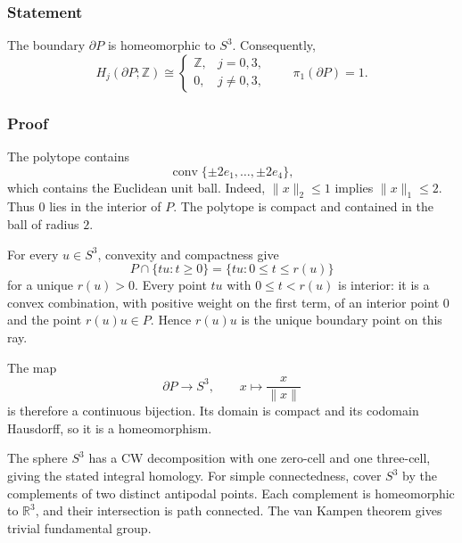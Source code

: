 \documentclass[
  10pt,
  a4paper,
]{article}
\begin{document}
\subsubsection{Statement}\label{statement-1}

The boundary \(\partial P\) is homeomorphic to \(S^3\). Consequently,
\begin{equation}
H_j(\partial P;\mathbb Z)\cong
\begin{cases}
\mathbb Z,&j=0,3,\\
0,&j\ne0,3,
\end{cases}
\qquad
\pi_1(\partial P)=1.
\end{equation}

\subsubsection{Proof}\label{proof-1}

The polytope contains \begin{equation}
\operatorname{conv}\{\pm2e_1,\ldots,\pm2e_4\},
\end{equation} which contains the Euclidean unit ball. Indeed,
\(\|x\|_2\le1\) implies \(\|x\|_1\le2\). Thus \(0\) lies in the interior
of \(P\). The polytope is compact and contained in the ball of radius
\(2\).

For every \(u\in S^3\), convexity and compactness give \begin{equation}
P\cap\{tu:t\ge0\}=\{tu:0\le t\le r(u)\}
\end{equation} for a unique \(r(u)>0\). Every point \(tu\) with
\(0\le t<r(u)\) is interior: it is a convex combination, with positive
weight on the first term, of an interior point \(0\) and the point
\(r(u)u\in P\). Hence \(r(u)u\) is the unique boundary point on this
ray.

The map \begin{equation}
\partial P\longrightarrow S^3,\qquad x\longmapsto\frac{x}{\|x\|}
\end{equation} is therefore a continuous bijection. Its domain is
compact and its codomain Hausdorff, so it is a homeomorphism.

The sphere \(S^3\) has a CW decomposition with one zero-cell and one
three-cell, giving the stated integral homology. For simple
connectedness, cover \(S^3\) by the complements of two distinct
antipodal points. Each complement is homeomorphic to \(\mathbb R^3\),
and their intersection is path connected. The van Kampen theorem gives
trivial fundamental group.
\end{document}
